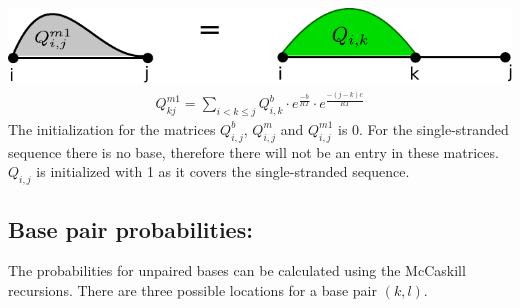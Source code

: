 \documentclass[11pt,a4paper]{report}
\begin{document}
\includegraphics[scale=0.65]{QM1.pdf}
\begin{align}
Q_{kj}^{m1} = \sum\limits_{i< k \leq j} Q_{i,k}^b \cdot e^\frac{-b}{RT} \cdot e^\frac{-(j-k)c}{RT}
\end{align}
The initialization for the matrices $Q_{i,j}^b$, $Q_{i,j}^m$ and $Q_{i,j}^{m1}$ is 0. For the single-stranded sequence there is no base, therefore there will not be an entry in these matrices. $Q_{i,j}$ is initialized with 1 as it covers the single-stranded sequence.\\
\subsection*{Base pair probabilities:}
The probabilities for unpaired bases can be calculated using the McCaskill recursions. There are three possible locations for a base pair $(k,l)$.\\
\end{document}
